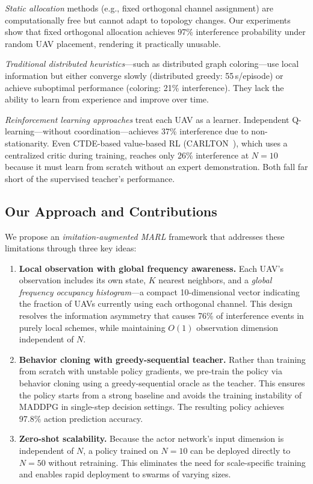 \documentclass[journal]{IEEEtran}
\begin{document}
\textit{Static allocation} methods (e.g., fixed orthogonal channel assignment) are computationally free but cannot adapt to topology changes. Our experiments show that fixed orthogonal allocation achieves 97\% interference probability under random UAV placement, rendering it practically unusable.

\textit{Traditional distributed heuristics}---such as distributed graph coloring---use local information but either converge slowly (distributed greedy: 55\,s/episode) or achieve suboptimal performance (coloring: 21\% interference). They lack the ability to learn from experience and improve over time.

\textit{Reinforcement learning approaches} treat each UAV as a learner. Independent Q-learning---without coordination---achieves 37\% interference due to non-stationarity. Even CTDE-based value-based RL (CARLTON~\cite{ref_carlton}), which uses a centralized critic during training, reaches only 26\% interference at $N=10$ because it must learn from scratch without an expert demonstration. Both fall far short of the supervised teacher's performance.

\subsection{Our Approach and Contributions}

We propose an \emph{imitation-augmented MARL} framework that addresses these limitations through three key ideas:

\begin{enumerate}
    \item \textbf{Local observation with global frequency awareness.} Each UAV's observation includes its own state, $K$ nearest neighbors, and a \emph{global frequency occupancy histogram}---a compact 10-dimensional vector indicating the fraction of UAVs currently using each orthogonal channel. This design resolves the information asymmetry that causes 76\% of interference events in purely local schemes, while maintaining $O(1)$ observation dimension independent of $N$.

    \item \textbf{Behavior cloning with greedy-sequential teacher.} Rather than training from scratch with unstable policy gradients, we pre-train the policy via behavior cloning using a greedy-sequential oracle as the teacher. This ensures the policy starts from a strong baseline and avoids the training instability of MADDPG in single-step decision settings. The resulting policy achieves 97.8\% action prediction accuracy.

    \item \textbf{Zero-shot scalability.} Because the actor network's input dimension is independent of $N$, a policy trained on $N=10$ can be deployed directly to $N=50$ without retraining. This eliminates the need for scale-specific training and enables rapid deployment to swarms of varying sizes.
\end{enumerate}
\end{document}
